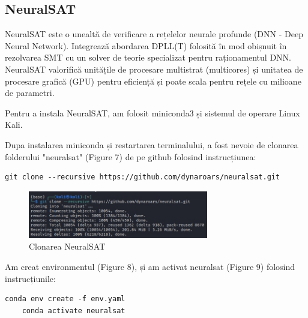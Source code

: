 \documentclass[12pt,a4paper]{article}
\theoremstyle{definition}
\theoremstyle{remark}
\begin{document}
\subsection{NeuralSAT}
NeuralSAT\cite{neuralsat} este o unealtă de verificare a rețelelor neurale profunde (DNN - Deep Neural Network). Integrează abordarea DPLL(T)\cite{dpllt} folosită în mod obișnuit în rezolvarea SMT cu un solver de teorie specializat pentru raționamentul DNN. NeuralSAT valorifică unitățile de procesare multistrat (multicores) și unitatea de procesare grafică (GPU) pentru eficiență și poate scala pentru rețele cu milioane de parametri. \par
Pentru a instala NeuralSAT, am folosit miniconda3 și sistemul de operare Linux Kali. \par
Dupa instalarea miniconda și restartarea terminalului, a fost nevoie de clonarea folderului "neuralsat"\cite{git3} (Figure 7) de pe github folosind instrucțiunea: \par
\begin{lstlisting}[style=bashstyle]
    git clone --recursive https://github.com/dynaroars/neuralsat.git
\end{lstlisting} \par
\begin{figure}[h!]
  \centering
    \includegraphics[width=0.7\textwidth]{neuralsat.jpg}
    \caption{Clonarea NeuralSAT}
\end{figure}
Am creat environmentul (Figure 8), și am activat neuralsat (Figure 9) folosind instrucțiunile: \par
\begin{lstlisting}[style=bashstyle]
    conda env create -f env.yaml
    conda activate neuralsat
\end{lstlisting}
\end{document}
